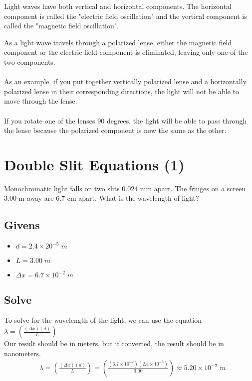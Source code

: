 \documentclass{article}
\begin{document}
Light waves have both vertical and horizontal components. The horizontal component is called the "electric field oscillation" and the vertical component is called the "magnetic field oscillation".\\
\begin{minipage}{0.33\textwidth}
\end{minipage}
\begin{minipage}{0.33\textwidth}
\end{minipage}
\indent As a light wave travels through a polarized lense, either the magnetic field component or the electric field component is eliminated, leaving only one of the two components.\\\\
As an example, if you put together vertically polarized lense and a horizontally polarized lense in their corresponding directions, the light will not be able to move through the lense. \\\\
If you rotate one of the lenses 90 degrees, the light will be able to pass through the lense because the polarized component is now the same as the other. \\


\section{Double Slit Equations (1)}
Monochromatic light falls on two slits 0.024 mm apart. The fringes on a screen 3.00 m away are 6.7 cm apart. What is the wavelength of light?
\subsection*{Givens}
\begin{itemize}
    \item $d = 2.4 \times 20^{-5}\;m$
    \item $L = 3.00\;m $
    \item $\Delta x = 6.7 \times 10^{-2}\;m$
\end{itemize}\leavevmode

\subsection*{Solve}
To solve for the wavelength of the light, we can use the equation $\lambda = \left(\frac{(\Delta x)(d)}{L}\right)$\\ Our result should be in meters, but if converted, the result should be in nanometers.\\
\begin{align*}
     & \lambda = \left(\frac{(\Delta x)(d)}{L}\right)      = \left(\frac{(6.7 \times 10^{-2})(2.4 \times 10^{-5})}{3.00}\right) \approx 5.20 \times 10^{-7}\;m
\end{align*}\leavevmode\\\\\\\\
\end{document}
